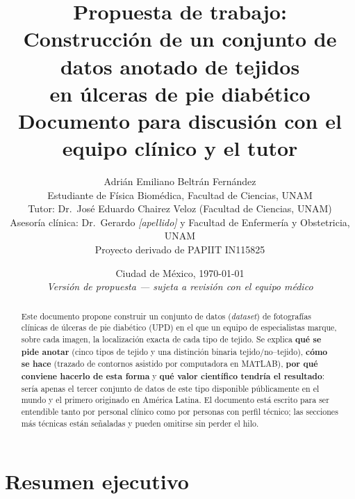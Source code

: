 \documentclass[12pt,letterpaper]{article}
\title{\textbf{Propuesta de trabajo:\\
Construcción de un conjunto de datos anotado de tejidos\\
en úlceras de pie diabético}\\[0.4em]
\large Documento para discusión con el equipo clínico y el tutor}
\author{Adrián Emiliano Beltrán Fernández\\
\small Estudiante de Física Biomédica, Facultad de Ciencias, UNAM\\[0.6em]
\small Tutor: Dr.\ José Eduardo Chairez Veloz (Facultad de Ciencias, UNAM)\\
\small Asesoría clínica: Dr.\ Gerardo \textit{[apellido]} y Facultad de Enfermería y Obstetricia, UNAM\\
\small Proyecto derivado de PAPIIT IN115825}
\date{Ciudad de México, \today\\[0.3em]
\small\textit{Versión de propuesta --- sujeta a revisión con el equipo médico}}
\begin{document}
\maketitle

\begin{abstract}
\noindent Este documento propone construir un conjunto de datos (\textit{dataset}) de fotografías
clínicas de úlceras de pie diabético (UPD) en el que un equipo de especialistas marque, sobre cada
imagen, la localización exacta de cada tipo de tejido. Se explica \textbf{qué se pide anotar}
(cinco tipos de tejido y una distinción binaria tejido/no--tejido), \textbf{cómo se hace}
(trazado de contornos asistido por computadora en MATLAB), \textbf{por qué conviene hacerlo de esta
forma} y \textbf{qué valor científico tendría el resultado}: sería apenas el tercer conjunto de datos
de este tipo disponible públicamente en el mundo y el primero originado en América Latina. El documento
está escrito para ser entendible tanto por personal clínico como por personas con perfil técnico;
las secciones más técnicas están señaladas y pueden omitirse sin perder el hilo.
\end{abstract}

\tableofcontents

\vspace{1em}

\section{Resumen ejecutivo}
\end{document}
